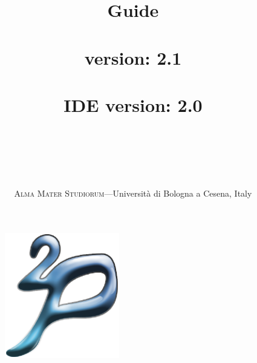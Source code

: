\documentclass[11pt]{report}
\title{{\huge{\bf{\tuprolog{} Guide\\\mbox{ }\\}}}
        \tuprolog{} version: 2.1\\\mbox{ }\\
        \tuprolog{} IDE version: 2.0\\\mbox{ }\\
{\small{
    \lastchangesdate{2007-04-19}\\
    }}
}
\author{ \mbox{ }\\ \textsc{Alma Mater Studiorum}---Universit\`{a} di Bologna a Cesena, Italy
}
\date{}
\newcommand\logo{
    \begin{figure}[tp]
        \begin{center}
            \includegraphics[width=5cm]{images/logo}
        \end{center}
\end{figure}
}
\begin{document}
\logo

\maketitle

\tableofcontents

%
%
%
%
%
%
%
%
%
%
%












\end{document}
